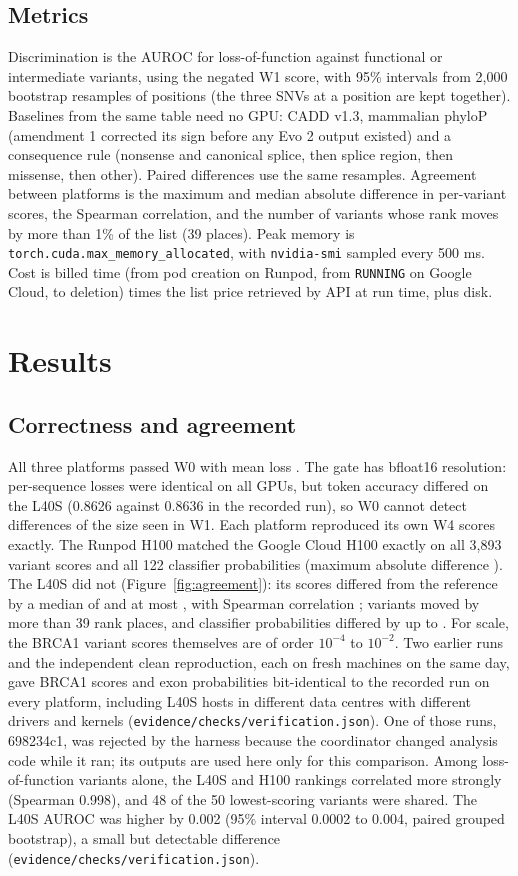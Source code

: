 \documentclass[11pt]{article}
\newcommand{\code}[1]{\texttt{#1}}
\begin{document}
\subsection{Metrics}
Discrimination is the AUROC for loss-of-function against functional or intermediate variants,
using the negated W1 score, with 95\% intervals from 2,000 bootstrap resamples of positions
(the three SNVs at a position are kept together). Baselines from the same table need no GPU: CADD v1.3,
mammalian phyloP (amendment 1 corrected its sign before any Evo 2 output existed) and a consequence
rule (nonsense and canonical splice, then splice region, then missense, then other). Paired
differences use the same resamples. Agreement between platforms is the maximum and median absolute
difference in per-variant scores, the Spearman correlation, and the number of variants whose rank
moves by more than 1\% of the list (39 places). Peak memory is
\code{torch.cuda.max\_memory\_allocated}, with \code{nvidia-smi} sampled every 500 ms. Cost is
billed time (from pod creation on Runpod, from \code{RUNNING} on Google Cloud, to deletion) times
the list price retrieved by API at run time, plus disk.

\section{Results}
\subsection{Correctness and agreement}
All three platforms passed W0 with mean loss \PTwoLoss. The gate has bfloat16 resolution:
per-sequence losses were identical on all GPUs, but token accuracy differed on the L40S
(0.8626 against 0.8636 in the recorded run), so W0 cannot detect differences of the size seen in W1. Each platform reproduced its own W4 scores
exactly. The Runpod H100 matched the Google Cloud H100 exactly on all 3,893 variant scores and all
122 classifier probabilities (maximum absolute difference \PThreeMaxDiff). The L40S did not
(Figure~\ref{fig:agreement}): its scores differed from the reference by a median of
\PFiveMedianDiff{} and at most \PFiveMaxDiff, with Spearman correlation \PFiveSpearman; \PFiveRankMoves{}
variants moved by more than 39 rank places, and classifier probabilities differed by up to
\PFiveExonDiff. For scale, the BRCA1 variant scores themselves are of order $10^{-4}$ to $10^{-2}$.
Two earlier runs and the independent clean reproduction, each on fresh machines on the same day,
gave BRCA1 scores and exon probabilities bit-identical to the recorded run on every platform, including L40S hosts in different data
centres with different drivers and kernels (\code{evidence/checks/verification.json}). One of
those runs, 698234c1, was rejected by the harness because the coordinator changed analysis code
while it ran; its outputs are used here only for this comparison. Among loss-of-function variants
alone, the L40S and H100 rankings correlated more strongly (Spearman 0.998), and 48 of the 50
lowest-scoring variants were shared. The L40S AUROC was higher by 0.002 (95\% interval 0.0002 to
0.004, paired grouped bootstrap), a small but detectable difference
(\code{evidence/checks/verification.json}).
\end{document}
